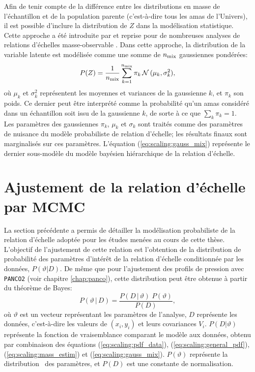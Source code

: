 Afin de tenir compte de la différence entre les distributions en masse de l'échantillon et de la population parente (c'est-à-dire tous les amas de l'Univers), il est possible d'inclure la distribution de $Z$ dans la modélisation statistique.
Cette approche a été introduite par  et reprise pour de nombreuses analyses de relations d'échelles masse-observable \cite{sereno_comparing_2015, sereno_bayesian_2016, mantz_gibbs_2016}.
Dans cette approche, la distribution de la variable latente est modélisée comme une somme de $n_{\rm mix}$ gaussiennes pondérées:
\begin{equation}
    \label{eq:scaling:gauss_mix}
    P(Z) = \frac{1}{n_{\rm mix}}\sum_{k=1}^{n_{\rm mix}} \pi_k \, \mathcal{N}\,(\mu_k, \sigma_k^2),
\end{equation}
où $\mu_k$ et $\sigma_k^2$ représentent les moyennes et variances de la gaussienne $k$, et $\pi_k$ son poids\footnotemark.
Ce dernier peut être interprété comme la probabilité qu'un amas considéré dans un échantillon soit issu de la gaussienne $k$, de sorte à ce que $\sum_k \pi_k = 1$. \\
Les paramètres des gaussiennes $\pi_k$, $\mu_k$ et $\sigma_k$ sont traités comme des paramètres de nuisance du modèle probabiliste de relation d'échelle; les résultats finaux sont marginalisés sur ces paramètres.
L'équation (\ref{eq:scaling:gauss_mix}) représente le dernier sous-modèle du modèle bayésien hiérarchique de la relation d'échelle.

\section{Ajustement de la relation d'échelle par MCMC} \label{sec:scaling:mcmc}

La section précédente a permis de détailler la modélisation probabiliste de la relation d'échelle adoptée pour les études menées au cours de cette thèse.
L'objectif de l'ajustement de cette relation est l'obtention de la distribution de probabilité des paramètres d'intérêt de la relation d'échelle conditionnée par les données, $P(\vartheta | D)$.
De même que pour l'ajustement des profils de pression avec \texttt{PANCO2} (voir chapitre \ref{chap:panco}), cette distribution peut être obtenue à partir du théorème de Bayes:
\begin{equation}
    \label{eq:bayes_scaling}
    P(\vartheta \,|\, D) = \frac{P(D \,|\, \vartheta) \; P(\vartheta)}{P(D)},
\end{equation}
où $\vartheta$ est un vecteur représentant les paramètres de l'analyse, $D$ représente les données, c'est-à-dire les valeurs de $(x_i, y_i)$ et leurs covariances $V_i$.
$P(D|\vartheta)$ représente la fonction de vraisemblance comparant le modèle aux données, obtenu par combinaison des équations  (\ref{eq:scaling:pdf_data}), (\ref{eq:scaling:general_pdf}), (\ref{eq:scaling:mass_estim}) et (\ref{eq:scaling:gauss_mix}).
$P(\vartheta)$ représente la distribution \prior\ des paramètres, et $P(D)$ est une constante de normalisation.

